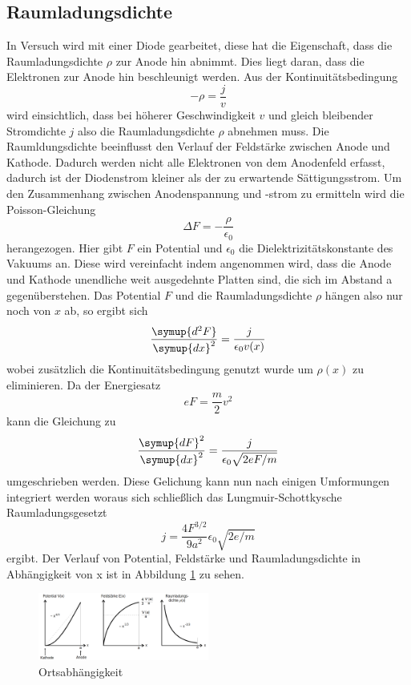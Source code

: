 \subsection{Raumladungsdichte}
In Versuch wird mit einer Diode gearbeitet, diese hat die Eigenschaft, dass die Raumladungsdichte $\rho$ zur Anode hin abnimmt.
Dies liegt daran, dass die Elektronen zur Anode hin beschleunigt werden.
Aus der Kontinuitätsbedingung
\begin{equation*}
    -\rho = \frac{j}{v}
\end{equation*}
wird einsichtlich, dass bei höherer Geschwindigkeit $v$ und gleich bleibender Stromdichte $j$ also die Raumladungsdichte $\rho$ abnehmen muss.
Die Raumldungsdichte beeinflusst den Verlauf der Feldstärke zwischen Anode und Kathode.
Dadurch werden nicht alle Elektronen von dem Anodenfeld erfasst, dadurch ist der Diodenstrom kleiner als der zu erwartende Sättigungsstrom.
Um den Zusammenhang zwischen Anodenspannung und -strom zu ermitteln wird die Poisson-Gleichung
\begin{equation*}
    \Delta F = -\frac{\rho}{\epsilon_0}
\end{equation*}
herangezogen.
Hier gibt $F$ ein Potential und $\epsilon_0$ die Dielektrizitätskonstante des Vakuums an.
Diese wird vereinfacht indem angenommen wird, dass die Anode und Kathode unendliche weit ausgedehnte Platten sind, die sich im Abstand a gegenüberstehen.
Das Potential $F$ und die Raumladungsdichte $\rho$ hängen also nur noch von $x$ ab, so ergibt sich
\begin{equation*}
\frac{\symup{d^2F}}{\symup{dx}^2} = \frac{j}{\epsilon_0 v(x)}
\end{equation*}
wobei zusätzlich die Kontinuitätsbedingung genutzt wurde um $\rho(x)$ zu eliminieren.
Da der Energiesatz
\begin{equation*}
    eF = \frac{m}{2}v^2
\end{equation*}
kann die Gleichung zu 
\begin{equation*}
    \frac{\symup{dF}^2}{\symup{dx}^2} = \frac{j}{\epsilon_0 \sqrt{2eF/m}}
\end{equation*}
umgeschrieben werden.
Diese Gelichung kann nun nach einigen Umformungen integriert werden woraus sich schließlich das Lungmuir-Schottkysche Raumladungsgesetzt
\begin{equation*}
    j = \frac{4F^{3/2}}{9a^2}\epsilon_0 \sqrt{2e/m}
    \label{eqn:j}
\end{equation*}
ergibt.
Der Verlauf von Potential, Feldstärke und Raumladungsdichte in Abhängigkeit von x ist in Abbildung \ref{fig:ort_raum_feld} zu sehen.
\begin{figure}
    \centering
    \includegraphics[width=0.5\textwidth]{content/data/Verlauf.png}
    \caption{Ortsabhängigkeit}
    \label{fig:ort_raum_feld}
\end{figure}

